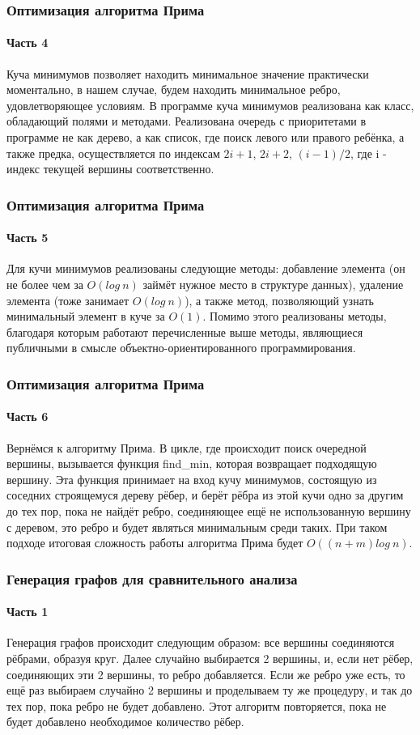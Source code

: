 \documentclass[aspectratio=169]{beamer}
\begin{document}
\begin{frame}
	\frametitle{Оптимизация алгоритма Прима}
	\framesubtitle{Часть 4}
	\hspace{0.5cm}Куча минимумов позволяет находить минимальное значение практически моментально, в нашем случае, будем находить минимальное ребро, удовлетворяющее условиям. В программе куча минимумов реализована как класс, обладающий полями и методами. Реализована очередь с приоритетами в программе не как дерево, а как список, где поиск левого или правого ребёнка, а также предка, осуществляется по индексам \( 2i + 1 \), \( 2i + 2 \), \( (i - 1)/2 \), где i - индекс текущей вершины соответственно.
\end{frame}

\begin{frame}
	\frametitle{Оптимизация алгоритма Прима}
	\framesubtitle{Часть 5}
	\hspace{0.5cm}Для кучи минимумов реализованы следующие методы: добавление элемента (он не более чем за \( O(log~n) \) займёт нужное место в структуре данных), удаление элемента (тоже занимает \( O(log~n) \)), а также метод, позволяющий узнать минимальный элемент в куче за \( O(1) \). Помимо этого реализованы методы, благодаря которым работают перечисленные выше методы, являющиеся публичными в смысле объектно-ориентированного программирования.
\end{frame}

\begin{frame}
	\frametitle{Оптимизация алгоритма Прима}
	\framesubtitle{Часть 6}
	\hspace{0.5cm}Вернёмся к алгоритму Прима. В цикле, где происходит поиск очередной вершины, вызывается функция find\_min, которая возвращает подходящую вершину. Эта функция принимает на вход кучу минимумов, состоящую из соседних строящемуся дереву рёбер, и берёт рёбра из этой кучи одно за другим до тех пор, пока не найдёт ребро, соединяющее ещё не использованную вершину с деревом, это ребро и будет являться минимальным среди таких.
	\hspace{0.5cm}При таком подходе итоговая сложность работы алгоритма Прима будет \( O((n + m) log~n) \).
\end{frame}

\begin{frame}
	\frametitle{Генерация графов для сравнительного анализа}
	\framesubtitle{Часть 1}
	\hspace{0.5cm}Генерация графов происходит следующим образом: все вершины соединяются рёбрами, образуя круг. Далее случайно выбирается 2 вершины, и, если нет рёбер, соединяющих эти 2 вершины, то ребро добавляется. Если же ребро уже есть, то ещё раз выбираем случайно 2 вершины и проделываем ту же процедуру, и так до тех пор, пока ребро не будет добавлено. Этот алгоритм повторяется, пока не будет добавлено необходимое количество рёбер.
\end{frame}
\end{document}

